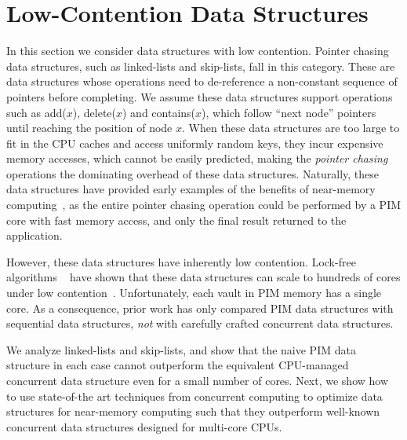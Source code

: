 
\section{Low-Contention Data Structures}
\label{section:pointer_chasing}

In this section we consider data structures with low contention. 
Pointer chasing data structures, 
such as linked-lists and skip-lists, fall in this category.  
These are data structures whose operations  
need to de-reference a non-constant sequence of pointers before completing. 
We assume these data structures support operations 
such as add($x$), delete($x$) and contains($x$), which follow ``next node'' pointers until 
reaching the position of node $x$.
When these data structures are too large to fit in the CPU caches 
and access uniformly random keys,
they incur expensive memory accesses, which cannot be easily predicted, 
making the \emph{pointer chasing} operations the dominating overhead of these data structures.
Naturally, these data structures have provided early examples of the benefits of near-memory 
computing~\cite{hsieh2016accelerating, Hashemi:2016}, 
as the entire pointer chasing operation could be performed by a PIM core with fast memory access, 
and only the final result returned to the application. 

However, these data structures have inherently low contention. 
Lock-free algorithms
~\cite{practicallf, skiplists-concpugh, valois, Herlihy08}
have shown that these data structures can scale to hundreds of cores under low contention~\cite{nodereplication}.
Unfortunately, each vault in 
PIM memory has a single core. 
As a consequence, prior work has only compared PIM data structures with sequential data structures, 
\emph{not} with carefully crafted concurrent data structures.

We analyze linked-lists and skip-lists, and show that the naive PIM data structure in each case cannot 
outperform the equivalent CPU-managed concurrent data structure even for a small number of cores. 
Next, we show how to use state-of-the art techniques from concurrent computing to 
optimize data structures for near-memory computing such that they outperform well-known concurrent data 
structures designed for multi-core CPUs. 

